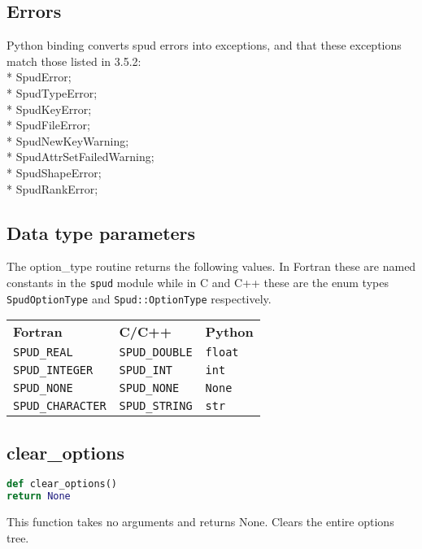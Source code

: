 \documentclass[a4paper, 11pt]{book}
\begin{document}
\subsection{Errors}

Python binding converts spud errors into exceptions, and that these exceptions match those listed in 3.5.2:  \\* 
SpudError; \\* 
SpudTypeError; \\* 
SpudKeyError; \\* 
SpudFileError; \\* 
SpudNewKeyWarning; \\* 
SpudAttrSetFailedWarning; \\* 
SpudShapeError; \\* 
SpudRankError; 

\subsection{Data type parameters}\label{sec:types}

The option\_type routine returns the following values. In Fortran these are
named constants in the \lstinline+spud+ module while in C and C++ these are
the enum types \lstinline+SpudOptionType+ and \lstinline+Spud::OptionType+
respectively.

\begin{tabular}{lll}
  \textbf{Fortran} & \textbf{C/C++} & \textbf{Python} \\
  \lstinline+SPUD_REAL+ & \lstinline+SPUD_DOUBLE+ & \lstinline+float+ \\
  \lstinline+SPUD_INTEGER+ & \lstinline+SPUD_INT+ & \lstinline+int+ \\
  \lstinline+SPUD_NONE+ & \lstinline+SPUD_NONE+ & \lstinline+None+ \\
  \lstinline+SPUD_CHARACTER+ & \lstinline+SPUD_STRING+ & \lstinline+str+
\end{tabular}

\subsection{clear\_options}

\begin{lstlisting}[language=Python]
def clear_options()
return None
\end{lstlisting}

This function takes no arguments and returns None.
Clears the entire options tree.
\end{document}
